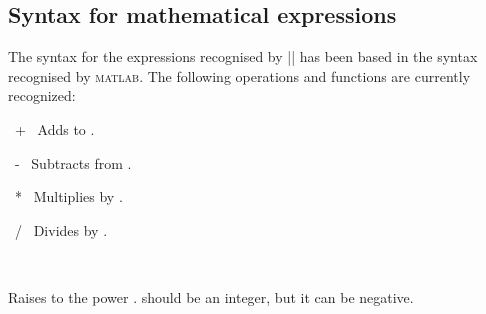 \subsection{Syntax for mathematical expressions}

\label{pgfmath-syntax}

The syntax for the expressions recognised by |\pgfmathparse| has been
based in the syntax recognised by \textsc{matlab}. The following 
operations and functions are currently recognized:

\begin{math-operator}{\ +\ }
	Adds  to .
	
\begin{codeexample}[post=\tt\footnotesize\pgfmathresult]
\end{codeexample}
\end{math-operator}\begin{math-operator}{\ -\ }
	Subtracts  from  .
	
\begin{codeexample}[post=\tt\footnotesize\pgfmathresult]
\end{codeexample}
\end{math-operator}
\begin{math-operator}{\ *\ }
	Multiplies  by  .
	
\begin{codeexample}[post=\tt\footnotesize\pgfmathresult]
\end{codeexample}

\end{math-operator}
\begin{math-operator}{\ /\ }
	Divides  by  .
	
\begin{codeexample}[post=\tt\footnotesize\pgfmathresult]
\end{codeexample}

\end{math-operator}
\begin{math-operator}{\ {}\ } 

Raises  to the power .  should be an integer, but it can be negative.

\begin{codeexample}[post=\tt\footnotesize\pgfmathresult]
\end{codeexample}

\begin{codeexample}[post=\tt\footnotesize\pgfmathresult]
\end{codeexample}
\end{math-operator}

